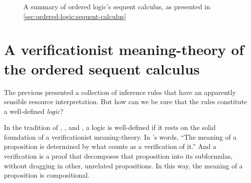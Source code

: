 \begin{figure}[tbp]
  \caption{A summary of  ordered logic's sequent calculus, as presented in \cref{sec:ordered-logic:sequent-calculus}}\label{fig:ordered-logic:sequent-calculus}
\end{figure}

\section{A verificationist meaning-theory of the ordered sequent calculus}\label{sec:ordered-logic:verifications}

The previous  presented a collection of inference rules that have an apparently sensible resource interpretation.
But how can we be sure that the rules constitute a well-defined \emph{logic}?

In the tradition of \citeauthor{Gentzen:MZ35}, \citeauthor{Dummett:WJ76}, and \citeauthor{Martin-Lof:Siena83}, a logic is well-defined if it rests on the solid foundation of a verificationist meaning-\-theory.\autocites{Gentzen:MZ35}{Dummett:WJ76}{Martin-Lof:Siena83}
In \citeauthor{Martin-Lof:Siena83}'s words, \enquote{The meaning of a proposition is determined by \textelp{} what counts as a verification of it.}
And a verification is a proof that decomposes that proposition into its subformulas, without dragging in other, unrelated propositions.
In this way, the meaning of a proposition is compositional.

